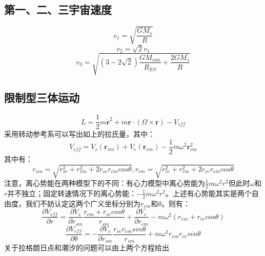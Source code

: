 \documentclass[a4paper, 10pt, openany]{book}%
\begin{document}
    \subsection{第一、二、三宇宙速度}
    $$v_1=\sqrt{\frac{GM_s}{R}}$$
    $$v_2=\sqrt{2}v_1$$
    $$v_3=\sqrt{(3-2\sqrt{2})\frac{GM_{sun}}{R_{ES}}+\frac{2GM_s}{R}}$$
    \subsection{限制型三体运动}
    $$L=\frac{1}{2}m\dot{\textbf{r}}^2+m\dot{\textbf{r}}\cdot(\Omega \times{\textbf{r}})-V_{eff}$$
    采用转动参考系可以写出如上的拉氏量，其中：
    $$V_{eff}=V_s(\textbf{r}_{sm})+V_e(\textbf{r}_{em})-\frac{1}{2}m\omega^2\textbf{r}_{cm}^2$$
    其中有：
    $$r_{sm}=\sqrt{r^2_{se}+r^2_{em}+2r_{se}r_{em}cos\theta},r_{cm}=\sqrt{r^2_{ce}+r^2_{em}+2r_{ce}r_{em}cos\theta}$$
    注意，离心势能在两种模型下的不同：有心力模型中离心势能为$\frac{1}{2}m\omega^2r^2$但此时$\omega$和$r$并不独立；固定转速情况下的离心势能：$-\frac{1}{2}m\omega^2r^2$。上述有心势能其实是两个自由度，我们不妨认定这两个广义坐标分别为$r_{em}$和$\theta$。则有：
    $$\frac{\partial V_{eff}}{\partial r}=\frac{\partial V_s}{\partial r_{sm}}\frac{r_{em}+r_{se}cos\theta}{r_{sm}}+\frac{\partial V_e}{\partial r_{em}}-m\omega^2(r_{em}+r_{ce}cos\theta)$$
    $$\frac{\partial V_{eff}}{\partial \theta}=-\frac{\partial V_s}{\partial r_{sm}}\frac{r_{se}r_{em}sin\theta}{r_{sm}}+m\omega^2r_{em}r_{ce}sin\theta$$
    关于拉格朗日点和潮汐的问题可以由上两个方程给出
\end{document}
